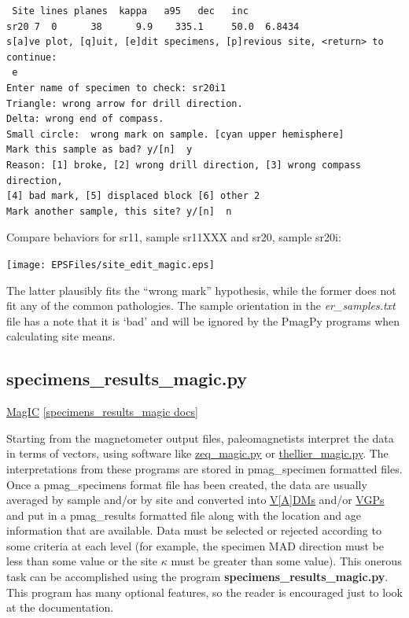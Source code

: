 \documentclass[11pt]{book}
\begin{document}
{{{\begin{verbatim}
 Site lines planes  kappa   a95   dec   inc
sr20 7  0      38      9.9    335.1     50.0  6.8434
s[a]ve plot, [q]uit, [e]dit specimens, [p]revious site, <return> to continue:
 e
Enter name of specimen to check: sr20i1
Triangle: wrong arrow for drill direction.
Delta: wrong end of compass.
Small circle:  wrong mark on sample. [cyan upper hemisphere]
Mark this sample as bad? y/[n]  y
Reason: [1] broke, [2] wrong drill direction, [3] wrong compass direction,
[4] bad mark, [5] displaced block [6] other 2
Mark another sample, this site? y/[n]  n
\end{verbatim}


Compare behaviors for sr11, sample sr11XXX and sr20, sample sr20i:

\texttt{[image: EPSFiles/site\_edit\_magic.eps]}

  The latter plausibly fits the ``wrong mark'' hypothesis, while the former does not fit any of the common pathologies.  The sample orientation in the {\it er\_samples.txt} file has a note that it is `bad' and will be ignored by the PmagPy programs when calculating site means.





\subsection{specimens\_results\_magic.py}
\href{#MagIC}{MagIC}
\href{https://github.com/PmagPy/PmagPy/blob/master/programs/specimens_results_magic.py}{[specimens\_results\_magic docs]}

Starting from the magnetometer output files, paleomagnetists interpret the data in terms of vectors, using software like \href{#zeq_magic.py}{zeq\_magic.py} or \href{thellier_magic.py}{thellier\_magic.py}.  The interpretations from these programs are stored in pmag\_specimen formatted files.
Once a pmag\_specimens format file has been created, the data are usually  averaged by sample and/or by site and converted into \href{http://earthref.org/MAGIC/books/Tauxe/Essentials/WebBook3ch2.html#Virtual_dipole_moment}{V[A]DMs} and/or
\href{http://earthref.org/MAGIC/books/Tauxe/Essentials/WebBook3ch2.html#Virtual_geomagnetic_poles}{VGPs} and put in a pmag\_results formatted file along with the location and age information that are available.  Data must be selected or rejected according to some criteria at each level (for example, the specimen MAD direction must be less than some value or the site $\kappa$ must be greater than some value).   This onerous task can be accomplished using the program {\bf specimens\_results\_magic.py}.          This program has many optional features, so the reader is encouraged just to look at the documentation.

}}}
\end{document}
